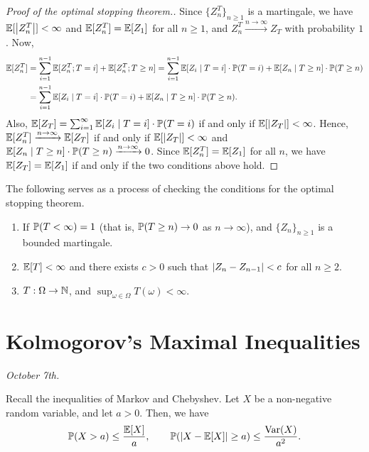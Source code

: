 \begin{proof}[Proof of the optimal stopping theorem.]
    Since $\{Z_{n}^{T}\}_{n \geq 1}$ is a martingale, we have $\mathbb{E}[\left| Z_{n}^{T} \right|] < \infty$ and $\mathbb{E}[Z_{n}^{T}] = \mathbb{E}[Z_{1}]$ for all $n \geq 1$, and $Z_{n}^{T} \xrightarrow{n \to \infty} Z_{T}$ with probability $1$. Now,
    \begin{align}
        \mathbb{E}[Z_{n}^{T}] &= \sum_{i=1}^{n-1} \mathbb{E}[Z_{n}^{T}; T=i] + \mathbb{E}[Z_{n}^{T}; T \geq n] = \sum_{i=1}^{n-1} \mathbb{E}[Z_{i} \mid T=i] \cdot \mathbb{P}(T=i) + \mathbb{E}[Z_{n} \mid T \geq n] \cdot \mathbb{P}(T \geq n) \notag \\
        &= \sum_{i=1}^{n-1} \mathbb{E}[Z_{i} \mid T=i] \cdot \mathbb{P}(T=i) + \mathbb{E}[Z_{n} \mid T \geq n] \cdot \mathbb{P}(T \geq n).
    \end{align}
    Also, $\mathbb{E}[Z_{T}] = \sum_{i=1}^{\infty} \mathbb{E}[Z_{i} \mid T=i] \cdot \mathbb{P}(T=i)$ if and only if $\mathbb{E}[\left| Z_{T} \right|] < \infty$. Hence, $\mathbb{E}[Z_{n}^{T}] \xrightarrow{n \to \infty} \mathbb{E}[Z_{T}]$ if and only if $\mathbb{E}[\left| Z_{T} \right|] < \infty$ and $\mathbb{E}[Z_{n} \mid T \geq n] \cdot \mathbb{P}(T \geq n) \xrightarrow{n \to \infty} 0$. Since $\mathbb{E}[Z_{n}^{T}] = \mathbb{E}[Z_{1}]$ for all $n$, we have $\mathbb{E}[Z_{T}] = \mathbb{E}[Z_{1}]$ if and only if the two conditions above hold.
\end{proof}

The following serves as a process of checking the conditions for the optimal stopping theorem.
\begin{enumerate}
    \item If $\mathbb{P}(T < \infty) = 1$ (that is, $\mathbb{P}(T \geq n) \to 0$ as $n \to \infty$), and $\{Z_{n}\}_{n \geq 1}$ is a bounded martingale.
    \item $\mathbb{E}[T] < \infty$ and there exists $c > 0$ such that $\left| Z_{n} - Z_{n-1} \right| < c$ for all $n \geq 2$.
    \item $T:\Omega \to \mathbb{N}$, and $\sup_{\omega \in \Omega} T(\omega) < \infty$.
\end{enumerate}

\section{Kolmogorov's Maximal Inequalities}
\textit{October 7th.}

Recall the inequalities of Markov and Chebyshev. Let $X$ be a non-negative random variable, and let $a > 0$. Then, we have
\begin{align}
    \mathbb{P}(X > a) \leq \frac{\mathbb{E}[X]}{a}, \qquad \mathbb{P}(\left| X-\mathbb{E}[X] \right| \geq a) \leq \frac{\operatorname{Var}(X)}{a^{2}}.
\end{align}

